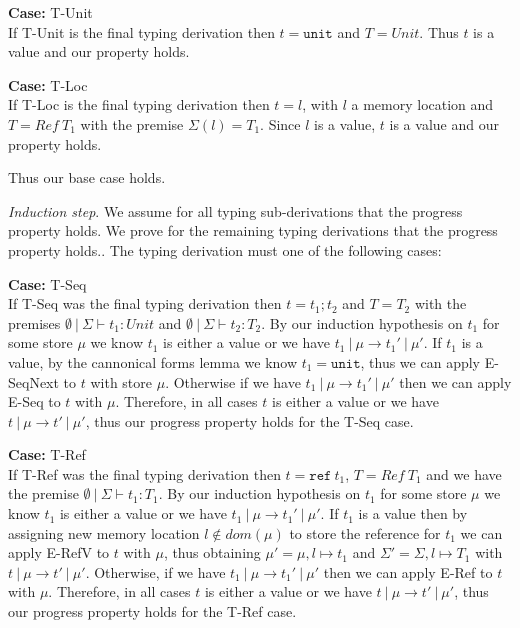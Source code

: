 \documentclass[12pt, fleqn]{article}
\begin{document}
\medskip
\textbf{Case:} T-Unit\\
If T-Unit is the final typing derivation then $t = \texttt{unit}$ and $T = Unit$. Thus $t$ is a value and our property holds.

\medskip
\textbf{Case:} T-Loc\\
If T-Loc is the final typing derivation then $t = l$, with $l$ a memory location and $T = Ref\:T_1$ with the premise $\Sigma(l) = T_1$. Since $l$ is a value, $t$ is a value and our property holds.

Thus our base case holds.

\medskip
\emph{Induction step}. We assume for all typing sub-derivations that the progress property holds. We prove for the remaining typing derivations that the progress property holds.. The typing derivation must one of the following cases:

\medskip
\textbf{Case:} T-Seq\\
If T-Seq was the final typing derivation then $t = t_1 ; t_2$ and $T = T_2$ with the premises $\emptyset\:|\:\Sigma \vdash t_1 : Unit$ and $\emptyset\:|\:\Sigma \vdash t_2 : T_2$. By our induction hypothesis on $t_1$ for some store $\mu$ we know $t_1$ is either a value or we have $t_1\:|\:\mu \rightarrow t_1'\:|\:\mu'$. 
If $t_1$ is a value, by the cannonical forms lemma we know $t_1 = \texttt{unit}$, thus we can apply E-SeqNext to $t$ with store $\mu$. Otherwise if we have $t_1\:|\:\mu \rightarrow t_1'\:|\:\mu'$ then we can apply E-Seq to $t$ with $\mu$. Therefore, in all cases $t$ is either a value or we have $t\:|\:\mu \rightarrow t'\:|\:\mu'$, thus our progress property holds for the T-Seq case.

\medskip
\textbf{Case:} T-Ref\\
If T-Ref was the final typing derivation then $t = \texttt{ref}\:t_1$, $T = Ref\: T_1$ and we have the premise $\emptyset\:|\:\Sigma \vdash t_1 : T_1$. By our induction hypothesis on $t_1$ for some store $\mu$ we know $t_1$ is either a value or we have $t_1\:|\:\mu \rightarrow t_1'\:|\:\mu'$. 
If $t_1$ is a value then by assigning new memory location $l \notin dom(\mu)$ to store the reference for $t_1$ we can apply E-RefV to $t$ with $\mu$, thus obtaining $\mu' = \mu,l \mapsto t_1$ and $\Sigma' = \Sigma, l \mapsto T_1$ with $t\:|\:\mu \rightarrow t'\:|\:\mu'$. Otherwise, if we have $t_1\:|\:\mu \rightarrow t_1'\:|\:\mu'$ then we can apply E-Ref to $t$ with $\mu$.
Therefore, in all cases $t$ is either a value or we have $t\:|\:\mu \rightarrow t'\:|\:\mu'$, thus our progress property holds for the T-Ref case.
\end{document}
